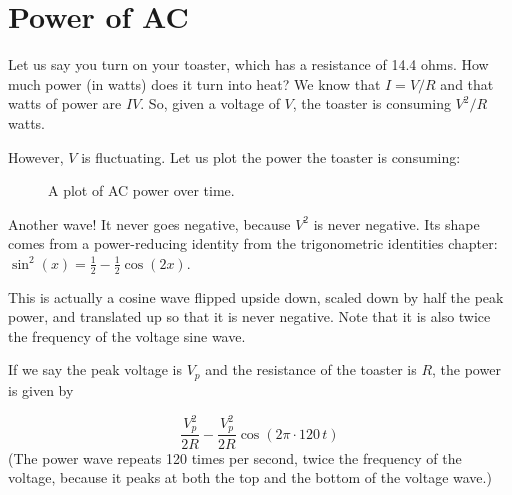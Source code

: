 \section{Power of AC}



Let us say you turn on your toaster, which has a resistance of 14.4
ohms. How much power (in watts) does it turn into heat? We know that $I = V/R$ and that watts of power are
$IV$. So, given a voltage of $V$, the toaster is consuming $V^2/R$
watts.

However, $V$ is fluctuating. Let us plot the power the toaster is consuming:
\begin{figure}[H]
    \centering
    \caption{A plot of AC power over time.}
    \label{fig:acpowerGraph}
\end{figure}
Another wave! It never goes negative, because $V^2$ is never negative.
Its shape comes from a power-reducing identity from the trigonometric
identities chapter: $\sin^2(x) = \frac{1}{2} - \frac{1}{2}\cos(2x)$.

This is actually a cosine wave flipped upside down, scaled down by
half the peak power, and translated up so that it is never
negative. Note that it is also twice the frequency of the voltage sine
wave.

If we say the peak voltage is $V_p$ and the resistance of the toaster
is $R$, the power is given by

$$\frac{V_p^2}{2R} - \frac{V_p^2}{2R} \cos \left(2\pi \cdot 120\, t \right)$$
(The power wave repeats 120 times per second, twice the frequency of the
voltage, because it peaks at both the top and the bottom of the voltage
wave.)

